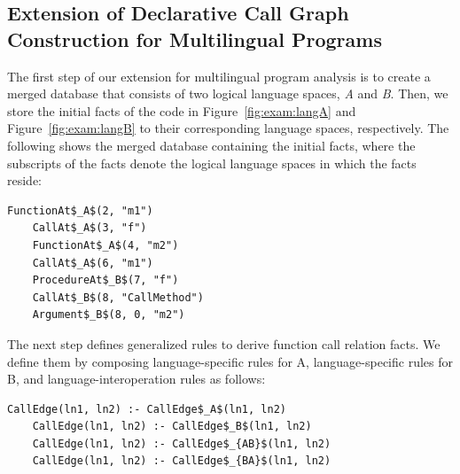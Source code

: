 %


\subsection{Extension of Declarative Call Graph Construction for Multilingual Programs}


The first step of our extension for multilingual program analysis is to create a
merged database that consists of two logical language spaces, {\it A} and {\it
B}. Then, we store the initial facts of the code in Figure~\ref{fig:exam:langA} and
Figure~\ref{fig:exam:langB} to
their corresponding language spaces, respectively. The following shows the merged
database containing the initial facts, where the subscripts of the facts denote
the logical language spaces in which the facts reside: 

\begin{lstlisting}[style=mrule]
    FunctionAt$_A$(2, "m1")
    CallAt$_A$(3, "f")
    FunctionAt$_A$(4, "m2")
    CallAt$_A$(6, "m1")
    ProcedureAt$_B$(7, "f")
    CallAt$_B$(8, "CallMethod")
    Argument$_B$(8, 0, "m2")
\end{lstlisting}


The next step defines generalized rules to derive function call relation
facts. We define them by composing language-specific rules for A,
language-specific rules for B, and language-interoperation rules as follows:

\begin{lstlisting}[style=mrule]
    CallEdge(ln1, ln2) :- CallEdge$_A$(ln1, ln2)
    CallEdge(ln1, ln2) :- CallEdge$_B$(ln1, ln2)
    CallEdge(ln1, ln2) :- CallEdge$_{AB}$(ln1, ln2)
    CallEdge(ln1, ln2) :- CallEdge$_{BA}$(ln1, ln2)
\end{lstlisting}

